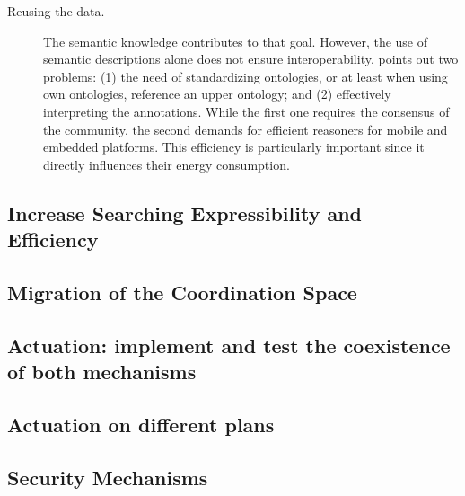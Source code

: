 \begin{description}
  \item[Reusing the data.] The semantic knowledge contributes to that goal.
			  However, the use of semantic descriptions alone does not ensure interoperability.
			  \citeauthor{barnaghi_semantics_2012} points out two problems:
			  (1) the need of standardizing ontologies, or at least when using own ontologies, reference an upper ontology; and
			  (2) effectively interpreting the annotations.
			  While the first one requires the consensus of the community, the second demands for efficient reasoners for mobile and embedded platforms.
			  This efficiency is particularly important since it directly influences their energy consumption.
			  
\end{description}


\subsection{Increase Searching Expressibility and Efficiency}


\subsection{Migration of the Coordination Space} %


\subsection{Actuation: implement and test the coexistence of both mechanisms}

\subsection{Actuation on different plans}


\subsection{Security Mechanisms}



